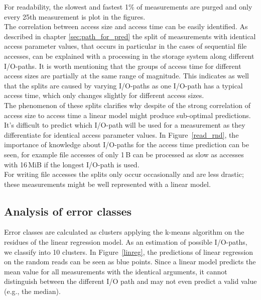 \documentclass{superfri}
\begin{document}
For readability, the slowest and fastest 1\% of measurements are purged and only every 25th measurement is plot in the figures.\\
The correlation between access size and access time can be easily identified.
As described in chapter \ref{sec:path_for_pred} the split of measurements with identical access parameter values, that occurs in particular in the cases of sequential file accesses, can be explained with a processing in the storage system along different I/O-paths.
It is worth mentioning that the groups of access time for different access sizes are partially at the same range of magnitude.
This indicates as well that the splits are caused by varying I/O-paths as one I/O-path has a typical access time, which only changes slightly for different access sizes.\\
The phenomenon of these splits clarifies why despite of the strong correlation of access size to access time a linear model might produce sub-optimal predictions. It's difficult to predict which I/O-path will be used for a measurement as they differentiate for identical access parameter values.
In Figure~\ref{read_rnd}, the importance of knowledge about I/O-paths for the  access time prediction can be seen, for example file accesses of only 1\,B can be processed as slow as accesses with 16\,MiB if the longest I/O-path is used.\\
For writing file accesses the splits only occur occasionally and are less drastic; these measurements might be well represented with a linear model.

\subsection{Analysis of error classes}
Error classes are calculated as clusters applying the k-means algorithm on the residues of the linear regression model.
As an estimation of possible I/O-paths, we classify into 10 clusters.
In Figure~\ref{linreg}, the predictions of linear regression on the random reads can be seen as blue points.
Since a linear model predicts the mean value for all measurements with the identical arguments, it cannot distinguish between the different I/O path and may not even predict a valid value (e.g., the median).
\end{document}
